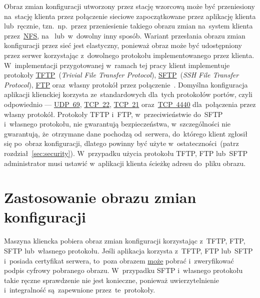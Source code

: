 \documentclass[thesis]{subfiles}
\begin{document}
Obraz zmian konfiguracji utworzony przez stację wzorcową może być przeniesiony na~stację klienta przez połączenie sieciowe zapoczątkowane przez aplikację klienta lub~ręcznie, tzn.~np.~przez przeniesienie takiego obrazu zmian na~system klienta przez~\href{https://en.wikipedia.org/wiki/Network_File_System}{NFS}, na~ lub~w~dowolny inny sposób. Wariant przesłania obrazu zmian konfiguracji przez sieć jest elastyczny, ponieważ obraz może być udostępniony przez serwer korzystając z~dowolnego protokołu implementowanego przez klienta. W~implementacji przygotowanej w~ramach tej pracy klient implementuje protokoły \href{https://en.wikipedia.org/wiki/Trivial_File_Transfer_Protocol}{TFTP}~(\emph{Trivial File Transfer Protocol}), \href{https://en.wikipedia.org/wiki/SSH_File_Transfer_Protocol}{SFTP}~(\emph{SSH File Transfer Protocol}), \href{https://en.wikipedia.org/wiki/File_Transfer_Protocol}{FTP} oraz~własny protokół przez połączenie~. Domyślna konfiguracja aplikacji klienckiej korzysta ze~standardowych dla~tych protokołów portów, czyli odpowiednio --- \href{https://www.iana.org/assignments/service-names-port-numbers/service-names-port-numbers.xhtml?search=69}{UDP~69}, \href{https://www.iana.org/assignments/service-names-port-numbers/service-names-port-numbers.xhtml?search=22}{TCP~22}, \href{https://www.iana.org/assignments/service-names-port-numbers/service-names-port-numbers.xhtml?search=21}{TCP~21} oraz~\href{https://www.iana.org/assignments/service-names-port-numbers/service-names-port-numbers.xhtml?search=4440}{TCP~4440} dla~połączenia przez własny protokół. Protokoły TFTP i~FTP, w~przeciwieństwie do~SFTP i~własnego protokołu, nie gwarantują bezpieczeństwa, w~szczególności nie gwarantują, że~otrzymane dane pochodzą od~serwera, do~którego klient zgłosił się po~obraz konfiguracji, dlatego powinny być użyte w~ostateczności~(patrz rozdział~\ref{sec:security}). W~przypadku użycia protokołu TFTP, FTP lub~SFTP administrator musi ustawić w~aplikacji klienta ścieżkę adresu do~pliku obrazu.


\section{Zastosowanie obrazu zmian konfiguracji}
\label{sec:zastosowanie-obrazu-konfiguracji}

Maszyna kliencka pobiera obraz zmian konfiguracji korzystając z~TFTP, FTP, SFTP lub~własnego protokołu. Jeśli aplikacja korzysta z~TFTP, FTP lub~SFTP i~posiada certyfikat serwera, to~poza obrazem \href{https://superuser.com/a/426345/139893}{może} pobrać i~zweryfikować podpis cyfrowy pobranego obrazu. W~przypadku SFTP i~własnego protokołu takie ręczne sprawdzenie nie jest konieczne, ponieważ uwierzytelnienie i~integralność są~zapewnione przez~te~protokoły.
\end{document}
